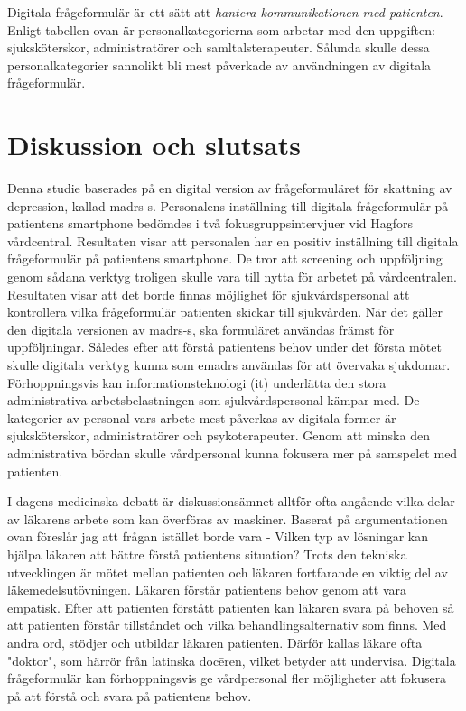 \documentclass[12pt,a4paper,oneside]{article}
\let\oldcite\cite
\renewcommand*\cite[1]{\textsuperscript{\oldcite{#1}}}
\begin{document}
\newpage
Digitala fr{\aa}geformul{\"a}r {\"a}r ett s{\"a}tt att {\it hantera kommunikationen med patienten}. Enligt tabellen ovan {\"a}r personalkategorierna som arbetar med den uppgiften: sjuksk{\"o}terskor, administrat{\"o}rer och samltalsterapeuter. S{\aa}lunda skulle dessa personalkategorier sannolikt bli mest p{\aa}verkade av anv{\"a}ndningen av digitala fr{\aa}geformul{\"a}r.

\section*{Diskussion och slutsats}
Denna studie baserades p{\aa} en digital version av fr{\aa}geformul{\"a}ret f{\"o}r skattning av depression, kallad {\sc madrs-s}. Personalens inst{\"a}llning till digitala fr{\aa}geformul{\"a}r p{\aa} patientens smartphone bed{\"o}mdes i tv{\aa} fokusgruppsintervjuer vid Hagfors v{\aa}rdcentral. Resultaten visar att personalen har en positiv inst{\"a}llning till digitala fr{\aa}geformul{\"a}r p{\aa} patientens smartphone. De tror att screening och uppf{\"o}ljning genom s{\aa}dana verktyg troligen skulle vara till nytta f{\"o}r arbetet p{\aa} v{\aa}rdcentralen. Resultaten visar att det borde finnas m{\"o}jlighet f{\"o}r sjukv{\aa}rdspersonal att kontrollera vilka fr{\aa}geformul{\"a}r patienten skickar till sjukv{\aa}rden. N{\"a}r det g{\"a}ller den digitala versionen av {\sc madrs-s}, ska formul{\"a}ret anv{\"a}ndas fr{\"a}mst f{\"o}r uppf{\"o}ljningar. S{\aa}ledes efter att f{\"o}rst{\aa} patientens behov under det f{\"o}rsta m{\"o}tet skulle digitala verktyg kunna som e{\sc madrs} anv{\"a}ndas f{\"o}r att {\"o}vervaka sjukdomar. F{\"o}rhoppningsvis kan informationsteknologi ({\sc it}) underl{\"a}tta den stora administrativa arbetsbelastningen som sjukv{\aa}rdspersonal k{\"a}mpar med\cite{disc2}. De kategorier av personal vars arbete mest p{\aa}verkas av digitala former {\"a}r sjuksk{\"o}terskor, administrat{\"o}rer och psykoterapeuter. Genom att minska den administrativa b{\"o}rdan skulle v{\aa}rdpersonal kunna fokusera mer p{\aa} samspelet med patienten.

I dagens medicinska debatt {\"a}r diskussions{\"a}mnet alltf{\"o}r ofta ang{\aa}ende vilka delar av l{\"a}karens arbete som kan {\"o}verf{\"o}ras av maskiner\cite{disc3}. Baserat p{\aa} argumentationen ovan f{\"o}resl{\aa}r jag att fr{\aa}gan ist{\"a}llet borde vara - Vilken typ av l{\"o}sningar kan hj{\"a}lpa l{\"a}karen att b{\"a}ttre f{\"o}rst{\aa} patientens situation? Trots den tekniska utvecklingen {\"a}r m{\"o}tet mellan patienten och l{\"a}karen fortfarande en viktig del av l{\"a}kemedelsut{\"o}vningen. L{\"a}karen f{\"o}rst{\aa}r patientens behov genom att vara empatisk\cite{isc3}. Efter att patienten f{\"o}rst{\aa}tt patienten kan l{\"a}karen svara p{\aa} behoven s{\aa} att patienten f{\"o}rst{\aa}r tillst{\aa}ndet och vilka behandlingsalternativ som finns. Med andra ord, st{\"o}djer och utbildar l{\"a}karen patienten. D{\"a}rf{\"o}r kallas l{\"a}kare ofta "doktor", som h{\"a}rr{\"o}r fr{\aa}n latinska doc{\=e}ren, vilket betyder att undervisa\cite{disc5}. Digitala fr{\aa}geformul{\"a}r kan f{\"o}rhoppningsvis ge v{\aa}rdpersonal fler m{\"o}jligheter att fokusera p{\aa} att f{\"o}rst{\aa} och svara p{\aa} patientens behov.
\end{document}
